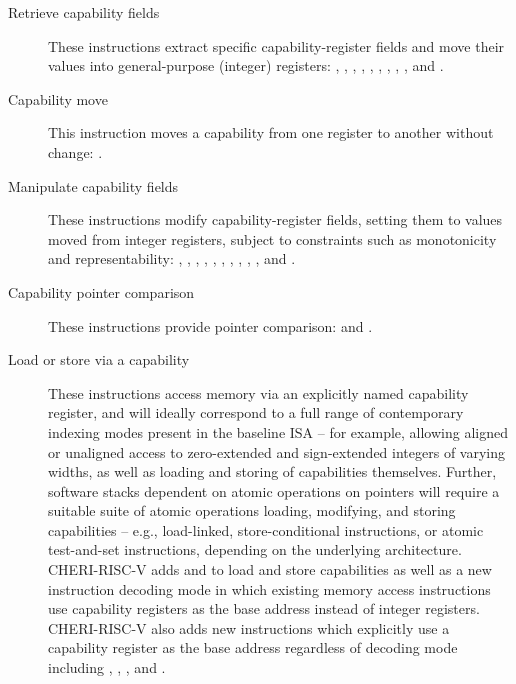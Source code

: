 \begin{description}
\item[Retrieve capability fields]
These instructions extract specific capability-register fields and move their
values into general-purpose (integer) registers:
, , , ,
, , ,
, , and .

\item[Capability move]
This instruction moves a capability from one register to another without
change: .

\item[Manipulate capability fields]
These instructions modify capability-register fields, setting them to values
moved from integer registers, subject to constraints such as monotonicity and
representability: , ,
, ,
, ,
, ,
, , and
.

\item[Capability pointer comparison]
These instructions provide pointer comparison:
 and
.

\item[Load or store via a capability]
These instructions access memory via an explicitly named capability
register, and will ideally correspond to a full range of contemporary
indexing modes present in the baseline ISA -- for example, allowing aligned or
unaligned access to zero-extended and sign-extended integers of varying
widths, as well as loading and storing of capabilities themselves.
Further, software stacks dependent on atomic operations on pointers will
require a suitable suite of atomic operations loading, modifying, and storing
capabilities -- e.g., load-linked, store-conditional instructions, or atomic
test-and-set instructions, depending on the underlying architecture.
CHERI-RISC-V adds  and  to load and store
capabilities as well as a new instruction decoding mode in which existing
memory access instructions use capability registers as the base
address instead of integer registers.  CHERI-RISC-V also adds new
instructions which explicitly use a capability register as the base
address regardless of decoding mode including
, ,
, and .


\end{description}
